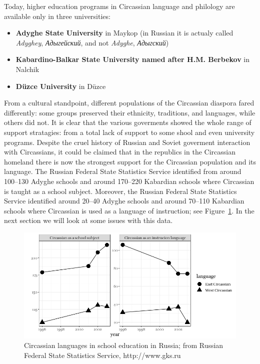 Today, higher education programs in Circassian language and philology are available only in three universities:
\begin{itemize}
\item  \textbf{Adyghe State University} in Maykop (in Russian it is actualy called \textit{Adyghey}, \textit{Адыгейский}, and not \textit{Adyghe}, \textit{Адыгский})
\item \textbf{Kabardino-Balkar State University named after H.M. Berbekov} in Nalchik
\item \textbf{Düzce University} in Düzce 
\end{itemize}
\par From a cultural standpoint, different populations of the Circassian diaspora fared differently: some groups preserved their ethnicity, traditions, and languages, while others did not. It is clear that the various goverments showed the whole range of support stratagies: from a total lack of support to some shool and even university programs. Despite the cruel history of Russian and Soviet goverment interaction with Circassians, it could be claimed that in the republics in the Circassian homeland there is now the strongest support for the Circassian population and its language. The Russian Federal State Statistics Service identified from around 100--130 Adyghe schools and around 170--220 Kabardian schools where Circassian is taught as a school subject. Moreover, the Russian Federal State Statistics Service identified around 20--40 Adyghe schools and around 70--110 Kabardian schools where Circassian is used as a language of instruction; see Figure~\ref{fig:circ-in-school}. In the next section we will look at some issues with this data.
\begin{figure}[t]
\includegraphics[width=\linewidth]{1_circassian_in_school_800_400}
\caption{Circassian languages in school education in Russia; from Russian Federal State Statistics Service, http://www.gks.ru}
\label{fig:circ-in-school}
\end{figure} 

